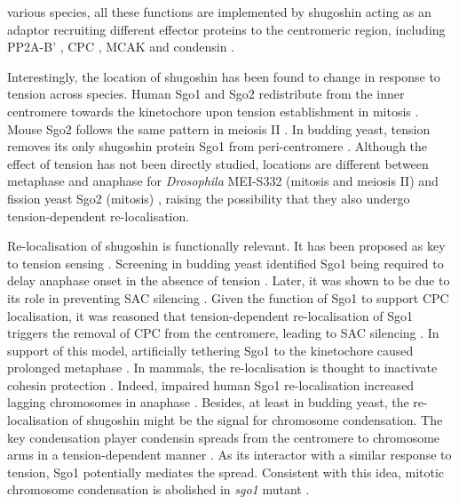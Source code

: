 various species, all these functions are implemented by shugoshin acting as an adaptor recruiting different effector proteins to the centromeric region, including PP2A-B' \citep{Xu2009StructureInteraction, Ueki2021AMitosis}, CPC \citep{Abad2022MechanisticCPC}, MCAK \citep{Tanno2010} and condensin \citep{Verzijlbergen2014, Yahya2020}. 

Interestingly, the location of shugoshin has been found to change in response to tension across species. Human Sgo1 and Sgo2 redistribute from the inner centromere towards the kinetochore upon tension establishment in mitosis \citep{Huang2007, Lee2008, Liu2013, Asai2020}. Mouse Sgo2 follows the same pattern in meiosis II \citep{Lee2008, Gomez2007}. In budding yeast, tension removes its only shugoshin protein Sgo1 from peri-centromere \citep{Eshleman2014, Nerusheva2014, Paldi2020ConvergentPericentromeres}. Although the effect of tension has not been directly studied, locations are different between metaphase and anaphase for \textit{Drosophila} MEI-S332 (mitosis and meiosis II) and fission yeast Sgo2 (mitosis) \citep{Clarke2005, Kawashima2007}, raising the possibility that they also undergo tension-dependent re-localisation. 

Re-localisation of shugoshin is functionally relevant. It has been proposed as key to tension sensing \citep{Marston2015}. Screening in budding yeast identified Sgo1 being required to delay anaphase onset in the absence of tension \citep{Indjeian2005a}. Later, it was shown to be due to its role in preventing SAC silencing \citep{Jin2013TheAttachment}. Given the function of Sgo1 to support CPC localisation, it was reasoned that tension-dependent re-localisation of Sgo1 triggers the removal of CPC from the centromere, leading to SAC silencing \citep{Nerusheva2014}. In support of this model, artificially tethering Sgo1 to the kinetochore caused prolonged metaphase \citep{Su2021SumoylationAnaphase}. In mammals, the re-localisation is thought to inactivate cohesin protection \citep{Lee2008}. Indeed, impaired human Sgo1 re-localisation increased lagging chromosomes in anaphase \citep{Liu2013}. Besides, at least in budding yeast, the re-localisation of shugoshin might be the signal for chromosome condensation. The key condensation player condensin spreads from the centromere to chromosome arms in a tension-dependent manner \citep{Leonard2015}. As its interactor with a similar response to tension, Sgo1 potentially mediates the spread. Consistent with this idea, mitotic chromosome condensation is abolished in \textit{sgo1} mutant \citep{Kruitwagen2018}. 

